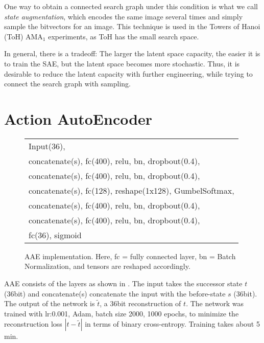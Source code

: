 \documentclass[11pt]{article}
\begin{document}
One way to obtain a connected search graph under this condition is
what we call \emph{state augmentation},
which encodes the same image several times and simply sample the bitvectors for an image.
This technique is used in the Towers of Hanoi (ToH) AMA$_1$ experiments, as ToH has the small search space.

In general, there is a tradeoff: The larger the latent space capacity, the easier it is to train the SAE,
but the latent space becomes more stochastic.
Thus, it is desirable to reduce the latent capacity with further engineering,
while trying to connect the search graph with sampling.


\section{Action AutoEncoder}


\begin{figure}[htb]
\centering
\begin{tabular}{|l|}
 Input(36),                                                  \\
 concatenate(s), fc(400), relu, bn, dropbout(0.4),           \\
 concatenate(s), fc(400), relu, bn, dropbout(0.4),           \\
 concatenate(s), fc(128), reshape(1x128), GumbelSoftmax,     \\
 concatenate(s), fc(400), relu, bn, dropbout(0.4),           \\
 concatenate(s), fc(400), relu, bn, dropbout(0.4),           \\
 fc(36), sigmoid
\end{tabular}
\caption{AAE implementation. Here, fc = fully connected layer, bn = Batch Normalization,
and tensors are reshaped accordingly.}
\label{fig:aae-detail}
\end{figure}

AAE consists of the layers as shown in .
The input takes the successor state $t$ (36bit) and concatenate(s) concatenate the input with the before-state $s$ (36bit).
The output of the network is $\tilde{t}$, a 36bit reconstruction of $t$.
The network was trained with lr:0.001, Adam, batch size 2000, 1000 epochs,
to minimize the reconstruction loss $|t-\tilde{t}|$ in terms of binary cross-entropy.
Training takes about 5 min.
\end{document}
